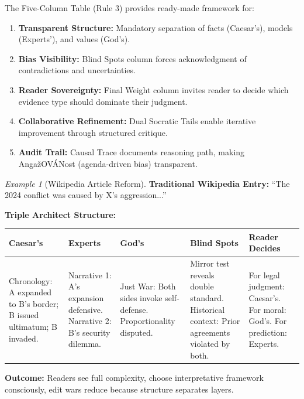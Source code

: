 \documentclass[11pt,a4paper]{article}
\theoremstyle{definition}
\theoremstyle{remark}
\newtheorem{example}{Example}[section]
\begin{document}
The Five-Column Table (Rule 3) provides ready-made framework for:

\begin{enumerate}
    \item \textbf{Transparent Structure:} Mandatory separation of facts (Caesar's), models (Experts'), and values (God's).
    
    \item \textbf{Bias Visibility:} Blind Spots column forces acknowledgment of contradictions and uncertainties.
    
    \item \textbf{Reader Sovereignty:} Final Weight column invites reader to decide which evidence type should dominate their judgment.
    
    \item \textbf{Collaborative Refinement:} Dual Socratic Tails enable iterative improvement through structured critique.
    
    \item \textbf{Audit Trail:} Causal Trace documents reasoning path, making AngažOVÁNost (agenda-driven bias) transparent.
\end{enumerate}

\begin{example}[Wikipedia Article Reform]
\textbf{Traditional Wikipedia Entry:}
``The 2024 conflict was caused by X's aggression...''

\textbf{Triple Architect Structure:}

\begin{center}
\scriptsize
\begin{tabular}{|p{2cm}|p{2cm}|p{2cm}|p{2.3cm}|p{2cm}|}
\hline
\textbf{Caesar's} & \textbf{Experts} & \textbf{God's} & \textbf{Blind Spots} & \textbf{Reader Decides} \\
\hline
Chronology: A expanded to B's border; B issued ultimatum; B invaded. & Narrative 1: A's expansion defensive. Narrative 2: B's security dilemma. & Just War: Both sides invoke self-defense. Proportionality disputed. & Mirror test reveals double standard. Historical context: Prior agreements violated by both. & For legal judgment: Caesar's. For moral: God's. For prediction: Experts. \\
\hline
\end{tabular}
\end{center}

\textbf{Outcome:} Readers see full complexity, choose interpretative framework consciously, edit wars reduce because structure separates layers.
\end{example}
\end{document}
